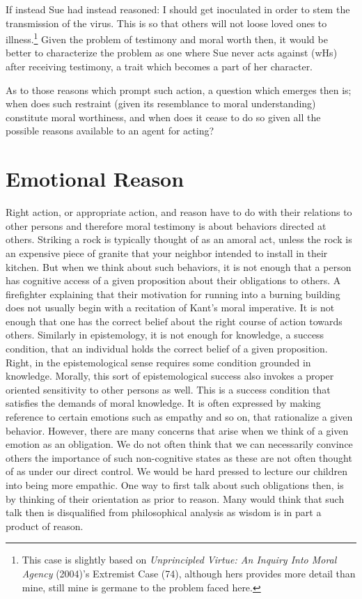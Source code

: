 \documentclass[12pt]{book}
\theoremstyle{definition}
\theoremstyle{remark}
\begin{document}
If instead Sue had instead reasoned: I should get inoculated in order to stem the transmission of the virus. This is so that others will not loose loved ones to illness.\footnote{This case is slightly based on \emph{Unprincipled {Virtue}: {An Inquiry Into Moral Agency}} (2004)'s Extremist Case (74), although hers provides more detail than mine, still mine is germane to the problem faced here.} Given the problem of testimony and moral worth then, it would be better to characterize the problem as one where Sue never acts against (wHs) after receiving testimony, a trait which becomes a part of her character.

As to those reasons which prompt such action, a question which emerges then is; when does such restraint (given its resemblance to moral understanding) constitute moral worthiness, and when does it cease to do so given all the possible reasons available to an agent for acting?

\chapter{Emotional Reason}\label{emotional-reason}

Right action, or appropriate action, and reason have to do with their relations to other persons and therefore moral testimony is about behaviors directed at others. Striking a rock is typically thought of as an amoral act, unless the rock is an expensive piece of granite that your neighbor intended to install in their kitchen. But when we think about such behaviors, it is not enough that a person has cognitive access of a given proposition about their obligations to others. A firefighter explaining that their motivation for running into a burning building does not usually begin with a recitation of Kant's moral imperative. It is not enough that one has the correct belief about the right course of action towards others. Similarly in epistemology, it is not enough for knowledge, a success condition, that an individual holds the correct belief of a given proposition. Right, in the epistemological sense requires some condition grounded in knowledge. Morally, this sort of epistemological success also invokes a proper oriented sensitivity to other persons as well. This is a success condition that satisfies the demands of moral knowledge. It is often expressed by making reference to certain emotions such as empathy and so on, that rationalize a given behavior. However, there are many concerns that arise when we think of a given emotion as an obligation. We do not often think that we can necessarily convince others the importance of such non-cognitive states as these are not often thought of as under our direct control. We would be hard pressed to lecture our children into being more empathic. One way to first talk about such obligations then, is by thinking of their orientation as prior to reason. Many would think that such talk then is disqualified from philosophical analysis as wisdom is in part a product of reason.
\end{document}
